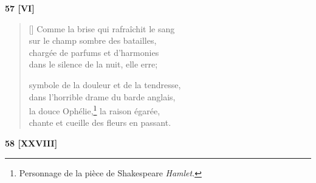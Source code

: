 \documentclass[a4paper,12pt]{book}
\begin{document}
\bigskip

\begin{center}
  \textbf{57 [VI]}
\end{center}

\settowidth{\versewidth}{chante et cueille des fleurs en passant.}

\begin{verse}[\versewidth]
  Comme la brise qui rafraîchit le sang \\
  sur le champ sombre des batailles, \\
  chargée de parfums et d'harmonies \\
  dans le silence de la nuit, elle erre;

  symbole de la douleur et de la tendresse, \\
  dans l'horrible drame du barde anglais, \\
  la douce Ophélie,\footnote{Personnage de la pièce de Shakespeare \emph{Hamlet}.} la raison égarée, \\
  chante et cueille des fleurs en passant.
\end{verse}

\bigskip

\begin{center}
  \textbf{58 [XXVIII]}
\end{center}

\settowidth{\versewidth}{dis-moi: est-ce que je touche et respire}
\end{document}
